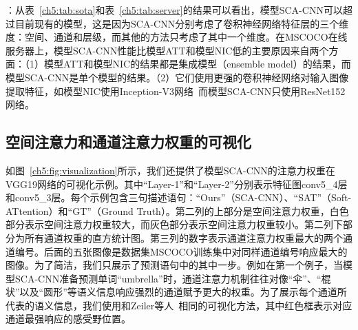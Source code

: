 \begin{table}[t]
\centering
{}
\caption{不同图像描述语句生成算法在数据集MSCOCO的在线服务器上的性能对比} 
\label{ch5:tab:server}
\end{table}

\textbf{}：从表~\ref{ch5:tab:sota}和表~\ref{ch5:tab:server}的结果可以看出，模型SCA-CNN可以超过目前现有的模型，这是因为SCA-CNN分别考虑了卷积神经网络特征层的三个维度：空间、通道和层级，而其他的方法只考虑了其中一个维度。在MSCOCO在线服务器上，模型SCA-CNN性能比模型ATT和模型NIC低的主要原因来自两个方面：（1）模型ATT和模型NIC的结果都是集成模型（ensemble model）的结果，而模型SCA-CNN是单个模型的结果。（2）它们使用更强的卷积神经网络对输入图像提取特征，如模型NIC使用Inception-V3网络~\cite{szegedy2016rethinking}而模型SCA-CNN只使用ResNet152网络。


\subsection{空间注意力和通道注意力权重的可视化}
如图~\ref{ch5:fig:visualization}所示，我们还提供了模型SCA-CNN的注意力权重在VGG19网络的可视化示例。其中“Layer-1”和“Layer-2”分别表示特征图conv5\_4层和conv5\_3层。每个示例包含三句描述语句：“Ours”（SCA-CNN）、“SAT”（Soft-ATtention）和“GT”（Ground Truth）。第二列的上部分是空间注意力权重，白色部分表示空间注意力权重较大，而灰色部分表示空间注意力权重较小。第二列下部分为所有通道权重的直方统计图。第三列的数字表示通道注意力权重最大的两个通道编号。后面的五张图像是数据集MSCOCO训练集中对同样通道编号响应最大的图像。为了简洁，我们只展示了预测语句中的其中一步。例如在第一个例子，当模型SCA-CNN准备预测单词“umbrella”时，通道注意力机制往往对像“伞”、“棍状”以及“圆形”等语义信息响应强烈的通道赋予更大的权重。为了展示每个通道所代表的语义信息，我们使用和Zeiler等人~\cite{zeiler2014visualizing}相同的可视化方法，其中红色框表示对应通道最强响应的感受野位置。


